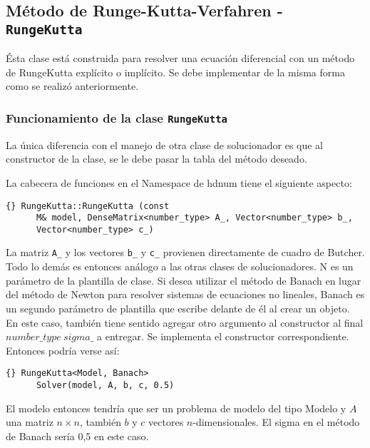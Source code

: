 \documentclass[a4paper,11pt]{article}
\theoremstyle{definition}
\begin{document}
\subsection{Método de Runge-Kutta-Verfahren - \lstinline{RungeKutta}}
Ésta clase está construida para resolver una ecuación diferencial con un método 
de RungeKutta explícito o implícito. Se debe implementar de la misma forma como 
se realizó anteriormente.  

\subsubsection{Funcionamiento de la clase \lstinline{RungeKutta}}
La única diferencia con el manejo de otra clase de solucionador es que 
al constructor de la clase, se le debe pasar la tabla del método deseado.

La cabecera de funciones en el Namespace de hdnum tiene el siguiente aspecto: 

{\footnotesize{\begin{lstlisting}{} RungeKutta::RungeKutta (const
      M& model, DenseMatrix<number_type> A_, Vector<number_type> b_,
      Vector<number_type> c_)
\end{lstlisting}}}

La matriz \lstinline{A_} y los vectores \lstinline{b_} y
\lstinline{c_} provienen directamente de cuadro de Butcher. Todo lo demás es entonces 
análogo a las otras clases de solucionadores. N es un parámetro de la plantilla de clase. 
Si desea utilizar el método de Banach en lugar del método de Newton para resolver sistemas 
de ecuaciones no lineales, Banach es un segundo parámetro de plantilla que escribe 
delante de él al crear un objeto. En este caso, también tiene sentido agregar otro 
argumento al constructor al final $number\_type \ sigma\_$ a entregar. Se implementa 
el constructor correspondiente. Entonces podría verse así:
{\footnotesize{\begin{lstlisting}{} RungeKutta<Model, Banach>
      Solver(model, A, b, c, 0.5)
\end{lstlisting}}}

El modelo entonces tendría que ser un problema de modelo del tipo Modelo y $A$ una matriz 
$n \times n$, también $b$ y $c$ vectores $n$-dimensionales. El sigma en el 
método de Banach sería 0,5 en este caso.
\end{document}
